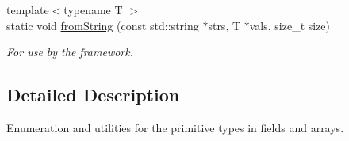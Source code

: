 \begin{DoxyCompactItemize}
{\footnotesize template$<$typename T $>$ }\\static void \hyperlink{classBUSBOY_1_1Primitive_a5d35a19bc1fb5a9c1cb319b01622a5e0}{fromString} (const std::string $\ast$strs, T $\ast$vals, size\_\-t size)
\begin{DoxyCompactList}\small\item\em For use by the framework. \item\end{DoxyCompactList}\end{DoxyCompactItemize}


\subsection{Detailed Description}
Enumeration and utilities for the primitive types in fields and arrays. 

